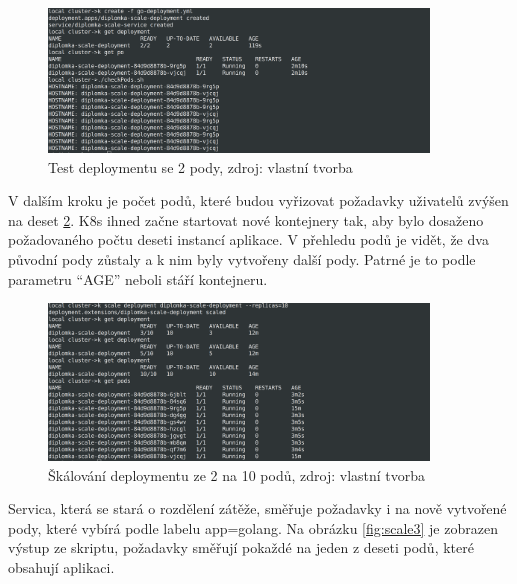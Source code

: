 \begin{figure}[H]
  \begin{centering}
    
	  \includegraphics[width=0.9\textwidth]{images/scale1.png}
    \par
	  \caption{Test deploymentu se 2 pody\label{fig:scale1}, zdroj: vlastní tvorba}
    \end{centering}
\end{figure}

V dalším kroku je počet podů, které budou vyřizovat požadavky uživatelů zvýšen na deset \ref{fig:scale2}. K8s ihned začne startovat nové kontejnery tak, aby bylo dosaženo \linebreak požadovaného počtu deseti instancí aplikace. V přehledu podů je vidět, že dva původní pody zůstaly a k nim byly vytvořeny další pody. Patrné je to podle parametru “AGE” neboli stáří kontejneru.

\begin{figure}[H]
  \begin{centering}
    
	  \includegraphics[width=0.9\textwidth]{images/scale2.png}
    \par
	  \caption{Škálování deploymentu ze 2 na 10 podů\label{fig:scale2}, zdroj: vlastní tvorba}
    \end{centering}
\end{figure}

Servica, která se stará o rozdělení zátěže, směřuje požadavky i na nově vytvořené pody, které vybírá podle labelu app=golang. Na obrázku \ref{fig:scale3} je zobrazen výstup ze skriptu, požadavky směřují pokaždé na jeden z deseti podů, které obsahují aplikaci.

